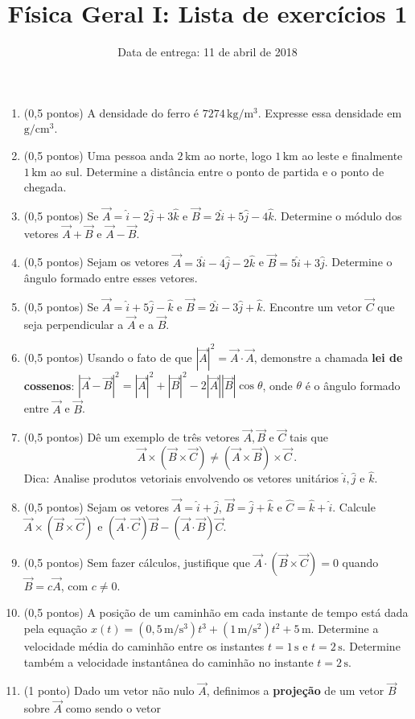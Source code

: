 \documentclass[12pt,a4paper]{article}
\title{Física Geral I: Lista de exercícios 1}
\author{Data de entrega: 11 de abril de 2018}
\date{}
\newcommand{\un}[1]{\mathrm{#1}}
\begin{document}
\maketitle
\begin{enumerate}
	\item (0,5 pontos) A densidade do ferro é $7274\,\un{kg}/\un{m}^3$. Expresse essa densidade em $\un{g}/\un{cm}^3$.
	\item (0,5 pontos) Uma pessoa anda $2\,\un{km}$ ao norte, logo $1\,\un{km}$ ao leste e finalmente $1\,\un{km}$ ao sul. Determine a distância entre o ponto de partida e o ponto de chegada.
	\item (0,5 pontos) Se $\vec A=\hat i-2\hat j+3\hat k$ e $\vec B=2\hat i+5\hat j-4\hat k$. Determine o módulo dos vetores $\vec A+\vec B$ e $\vec A-\vec B$.
	\item (0,5 pontos) Sejam os vetores $\vec A=3\hat i-4\hat j-2\hat k$ e $\vec B=5\hat i+3\hat j$. Determine o ângulo formado entre esses vetores. 
	\item (0,5 pontos) Se $\vec A=\hat i+5\hat j-\hat k$ e $\vec B=2\hat i-3\hat j+\hat k$. Encontre um vetor $\vec C$ que seja perpendicular a $\vec A$ e a $\vec B$. 
	\item (0,5 pontos) Usando o fato de que $|\vec A|^2=\vec A\cdot\vec A$, demonstre a chamada \textbf{lei de cossenos}: $|\vec A-\vec B|^2=|\vec A|^2+|\vec B|^2-2|\vec A||\vec B|\cos\theta$, onde $\theta$ é o ângulo formado entre $\vec A$ e $\vec B$.
	\item (0,5 pontos) Dê um exemplo de três vetores $\vec A, \vec B$ e $\vec C$ tais que
	$$\vec A\times (\vec B\times \vec C)\ne (\vec A\times \vec B)\times\vec C\,.$$
	Dica: Analise produtos vetoriais envolvendo os vetores unitários $\hat i,\hat j$ e $\hat k$.
	\item (0,5 pontos) Sejam os vetores $\vec A=\hat i+\hat j$, $\vec B=\hat j+\hat k$ e $\hat C=\hat k+\hat i$. Calcule $\vec A\times (\vec B\times\vec C)$ e $(\vec A\cdot\vec C)\vec B-(\vec A\cdot\vec B)\vec C$.
	\item (0,5 pontos) Sem fazer cálculos, justifique que $\vec A\cdot (\vec B\times\vec C)=0$ quando $\vec B=c\vec A$, com $c\ne 0$.
	\item (0,5 pontos) A posição de um caminhão em cada instante de tempo está dada pela equação $x(t)=(0,5 \,\un{m}/\un{s}^3)t^3+(1\,\un{m}/\un{s}^2)t^2+5\,\un{m}$. Determine a velocidade média do caminhão entre os instantes $t=1\,\un s$ e $t=2\,\un s$. Determine também a velocidade instantânea do caminhão no instante $t=2\,\un s$.
	\item (1 ponto) Dado um vetor não nulo $\vec A$, definimos a \textbf{projeção} de um vetor $\vec B$ sobre $\vec A$ como sendo o vetor

\end{enumerate}
\end{document}
